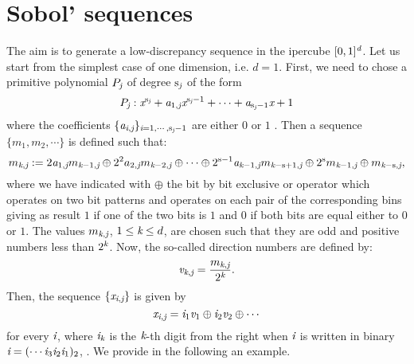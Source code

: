 \section{Sobol' sequences}
The aim is to generate a low-discrepancy sequence in the ipercube $[0,1]^{\textit{d}}$. 
Let us start from the simplest case of one dimension, i.e. $d=1$. First, we need to chose a primitive polynomial $P_{\textit{j}}$ of degree $\textrm{s}_{\textit{j}}$ of the form
\begin{equation}
P_{\textit{j}}:\textit{x}^{\textrm{s}_{\textit{j}}}+\textit{a}_{1, \textit{j}}\textit{x}^{\textrm{s}_{\textit{j}}-1}+\cdots+\textit{a}_{\textrm{s}_{\textit{j}}-1}\textit{x}+1
\end{equation}
where the coefficients $\{\textit{a}_{\textit{i},\textit{j}}\}_{\textit{i}= 1, \cdots, \textrm{s}_{\textit{j}}-1}$ are either $0$ or $1$ \cite{joe2008constructing}. 
Then a sequence $\{m_1,m_2,\cdots\}$ is defined such that:
\begin{equation}\label{eq:m}
m_{\textit{k}, \textit{j}} := 2\textit{a}_{1, \textit{j}}m_{\textit{k}-1, \textit{j}}\oplus 2^2a_{2, \textit{j}}m_{\textit{k}-2, \textit{j}}\oplus \cdots \oplus 2^{\textrm{s}-1}\textit{a}_{\textit{k}-1, \textit{j}}m_{\textit{k}-\textrm{s}+1, \textit{j}}\oplus 2^{\textrm{s}}m_{\textit{k}-1, \textit{j}}\oplus m_{\textit{k}-\textrm{s}, \textit{j}},
\end{equation}
where we have indicated with $\oplus$ the bit by bit exclusive or operator which operates on two bit patterns and operates on each pair of the corresponding bins giving as result $1$ if one of the two bits is $1$ and $0$ if both bits are equal either to $0$ or $1$. The values $m_{\textit{k}, \textit{j}}$, $1\leq\textit{k}\leq d$, are chosen such that they are odd and positive numbers less than $2^{\textit{k}}$. Now, the so-called direction numbers are defined by:
\begin{equation}\label{eq:dir_numb}
\textit{v}_{\textit{k}, \textit{j}}=\frac{m_{\textit{k}, \textit{j}}}{2^{\textit{k}}}.
\end{equation}
Then, the sequence $\{\textit{x}_{\textit{i}, \textit{j}}\}$ is given by
\begin{equation}\label{eq:x}
\textit{x}_{\textit{i}, \textit{j}} = \textit{i}_1\textit{v}_1\oplus \textit{i}_2\textit{v}_{2}\oplus \cdots
\end{equation}
for every $\textit{i}$, where $\textit{i}_{\textit{k}}$ is the $\textit{k}$-th digit from the right when $\textit{i}$ is written in binary $\textit{i} = (\cdots \textit{i}_3\textit{i}_2\textit{i}_1)_2$, \cite{joe2008notes}. We provide in the following an example. \\ \indent
